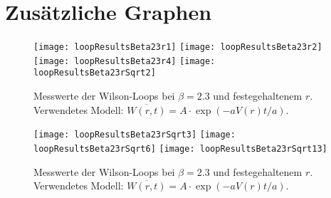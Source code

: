 
\chapter{Zusätzliche Graphen}
\label{sec:graphs}

\begin{figure}[htbp]
    \label{fig:beta23a}
    \centering
    \texttt{[image: loopResultsBeta23r1]}
    \texttt{[image: loopResultsBeta23r2]}
    \texttt{[image: loopResultsBeta23r4]}
    \texttt{[image: loopResultsBeta23rSqrt2]}
    \caption{Messwerte der Wilson-Loops bei $\beta=2.3$ und festegehaltenem
    $r$. Verwendetes Modell: $\overline{W(r,t)} = A \cdot \exp(-aV(r) t/a)$.}
\end{figure}

\begin{figure}[htbp]
    \label{fig:beta23b}
    \centering
    \texttt{[image: loopResultsBeta23rSqrt3]}
    \texttt{[image: loopResultsBeta23rSqrt6]}
    \texttt{[image: loopResultsBeta23rSqrt13]}
    \caption{Messwerte der Wilson-Loops bei $\beta=2.3$ und festegehaltenem
    $r$. Verwendetes Modell: $\overline{W(r,t)} = A \cdot \exp(-aV(r) t/a)$.}
\end{figure}
